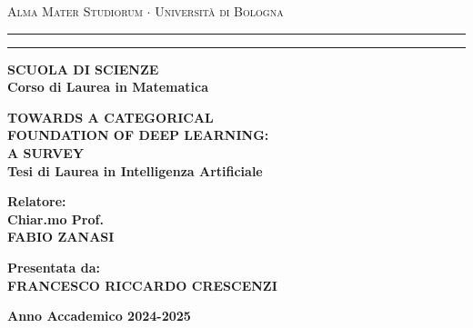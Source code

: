 ﻿\documentclass[12pt,a4paper]{report}
\begin{document}
	\begin{titlepage}
		\begin{center}
			{
				{\Large
					{\textsc{
						Alma Mater Studiorum $\cdot$ Università di Bologna
					}}
				}
			}
			\rule[0.1cm]{15.8cm}{0.1mm}
			\rule[0.5cm]{15.8cm}{0.6mm}
			{\small
				{\bf 
					SCUOLA DI SCIENZE\\
					Corso di Laurea in Matematica
				}
			}
			\end{center}
			\vspace{15mm}
			\begin{center}
				{\LARGE{\bf TOWARDS A CATEGORICAL }}\\
				\vspace{3mm}
				{\LARGE{\bf FOUNDATION OF DEEP LEARNING:}}\\
				\vspace{3mm}
				{\LARGE{\bf A SURVEY}}\\
				\vspace{19mm}
				{\large
					{\bf
						Tesi di Laurea in Intelligenza Artificiale
					}
				}
			\end{center}
			\vspace{40mm}
			\par
			\noindent
			\begin{minipage}[t]{0.47\textwidth}
				{\large
					{\bf
						Relatore:\\
						Chiar.mo Prof.\\
						FABIO ZANASI
					}
				}
			\end{minipage}
			\hfill
			\begin{minipage}[t]{0.47\textwidth}\raggedleft
				{\large
					{\bf 
						Presentata da:\\
						FRANCESCO RICCARDO CRESCENZI
					}
				}
			\end{minipage}
			\vspace{30mm}
			\begin{center}
			{\large
				{\bf 
					Anno Accademico 2024-2025 %
				}
			}
		\end{center}
	\end{titlepage}
\end{document}
